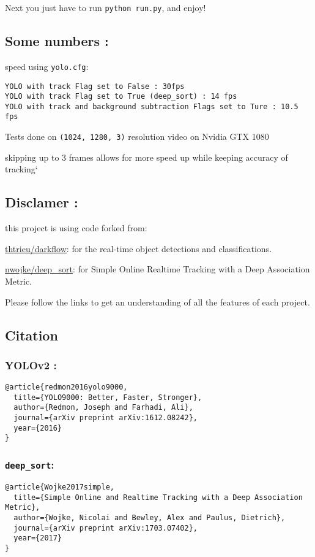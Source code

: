 \documentclass[letterpaper, 9pt, onecolumn, twoside, technote, final]{IEEEtran}
\begin{document}
Next you just have to run \texttt{python run.py}, and enjoy!

\subsection{Some numbers :}
\label{sec:orgbf356cd}
speed using \texttt{yolo.cfg}:

\begin{verbatim}
YOLO with track Flag set to False : 30fps
YOLO with track Flag set to True (deep_sort) : 14 fps
YOLO with track and background subtraction Flags set to Ture : 10.5 fps
\end{verbatim}

Tests done on \texttt{(1024, 1280, 3)} resolution video on Nvidia GTX 1080

skipping up to 3 frames allows for more speed up while keeping accuracy
of tracking`

\subsection{Disclamer :}
\label{sec:orgc636506}
this project is using code forked from:

\href{https://github.com/thtrieu/darkflow}{thtrieu/darkflow}: for the real-time object detections and
classifications.

\href{https://github.com/nwojke/deep\_sort}{nwojke/deep\_sort}: for Simple Online Realtime Tracking with a Deep
Association Metric.

Please follow the links to get an understanding of all the features of
each project.

\subsection{Citation}
\label{sec:org6f99117}
\subsubsection{YOLOv2 :}
\label{sec:org228dfd3}
\begin{verbatim}
@article{redmon2016yolo9000,
  title={YOLO9000: Better, Faster, Stronger},
  author={Redmon, Joseph and Farhadi, Ali},
  journal={arXiv preprint arXiv:1612.08242},
  year={2016}
}
\end{verbatim}

\subsubsection{\texttt{deep\_sort}:}
\label{sec:org079ecb8}
\begin{verbatim}
@article{Wojke2017simple,
  title={Simple Online and Realtime Tracking with a Deep Association Metric},
  author={Wojke, Nicolai and Bewley, Alex and Paulus, Dietrich},
  journal={arXiv preprint arXiv:1703.07402},
  year={2017}
}
\end{verbatim}
\end{document}
